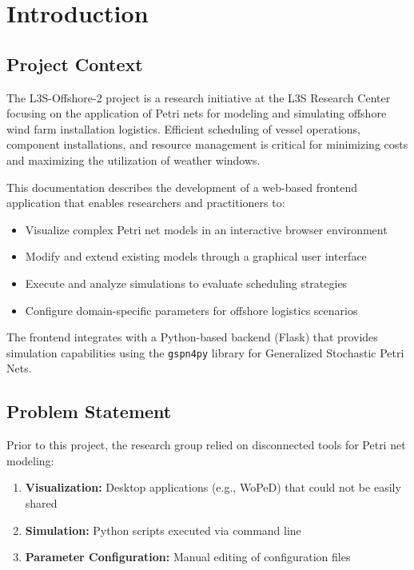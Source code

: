 \chapter{Introduction}
\label{chap:introduction}


\section{Project Context}

The L3S-Offshore-2 project is a research initiative at the L3S Research Center focusing on the application of Petri nets for modeling and simulating offshore wind farm installation logistics. Efficient scheduling of vessel operations, component installations, and resource management is critical for minimizing costs and maximizing the utilization of weather windows.

This documentation describes the development of a web-based frontend application that enables researchers and practitioners to:
\begin{itemize}
    \item Visualize complex Petri net models in an interactive browser environment
    \item Modify and extend existing models through a graphical user interface
    \item Execute and analyze simulations to evaluate scheduling strategies
    \item Configure domain-specific parameters for offshore logistics scenarios
\end{itemize}

The frontend integrates with a Python-based backend (Flask) that provides simulation capabilities using the \texttt{gspn4py} library for Generalized Stochastic Petri Nets.

\section{Problem Statement}
\label{sec:problem-statement}

Prior to this project, the research group relied on disconnected tools for Petri net modeling:
\begin{enumerate}
    \item \textbf{Visualization:} Desktop applications (e.g., WoPeD) that could not be easily shared
    \item \textbf{Simulation:} Python scripts executed via command line
    \item \textbf{Parameter Configuration:} Manual editing of configuration files
\end{enumerate}

